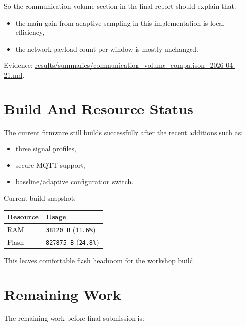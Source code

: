 \documentclass[12pt,a4paper]{article}
\begin{document}
So the communication-volume section in the final report should explain that:

\begin{itemize}
    \item the main gain from adaptive sampling in this implementation is local efficiency,
    \item the network payload count per window is mostly unchanged.
\end{itemize}

Evidence: \url{results/summaries/communication_volume_comparison_2026-04-21.md}.

\section{Build And Resource Status}

The current firmware still builds successfully after the recent additions such
as:

\begin{itemize}
    \item three signal profiles,
    \item secure MQTT support,
    \item baseline/adaptive configuration switch.
\end{itemize}

Current build snapshot:

\begin{center}
\begin{tabular}{|l|l|}
\hline
\textbf{Resource} & \textbf{Usage} \\
\hline
RAM & \texttt{38120 B} (\texttt{11.6\%}) \\
\hline
Flash & \texttt{827875 B} (\texttt{24.8\%}) \\
\hline
\end{tabular}
\end{center}

This leaves comfortable flash headroom for the workshop build.

\section{Remaining Work}

The remaining work before final submission is:
\end{document}
